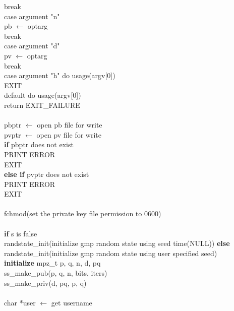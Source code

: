 \documentclass[12pt]{article}
\begin{document}
\indent \indent \indent \indent break \\
\indent \indent \indent case argument "n" \\
\indent \indent \indent \indent pb $\leftarrow$ optarg \\
\indent \indent \indent \indent break \\
\indent \indent \indent case argument "d" \\
\indent \indent \indent \indent pv $\leftarrow$ optarg \\
\indent \indent \indent \indent break \\
\indent \indent \indent case argument "h" do usage(argv[0]) \\
\indent \indent \indent \indent EXIT \\
\indent \indent \indent default do usage(argv[0]) \\
\indent \indent \indent \indent return EXIT\_FAILURE \\
\\
\indent pbptr $\leftarrow$ open pb file for write \\
\indent pvptr $\leftarrow$ open pv file for write \\
\indent \indent \textbf{if} pbptr does not exist \\
\indent \indent \indent PRINT ERROR \\
\indent \indent \indent EXIT \\
\indent \indent \textbf{else if} pvptr does not exist \\
\indent \indent \indent PRINT ERROR \\
\indent \indent \indent EXIT \\
\\
\indent fchmod(set the private key file permission to 0600) \\
\\
\indent \textbf{if} s is false \\
\indent \indent randstate\_init(initialize gmp random state using seed time(NULL))
\indent \textbf{else} \\
\indent \indent randstate\_init(initialize gmp random state using user specified seed)
\\
\indent \textbf{initialize} mpz\_t p, q, n, d, pq \\
\indent ss\_make\_pub(p, q, n, bits, iters) \\
\indent ss\_make\_priv(d, pq, p, q) \\
\\
\indent char *user $\leftarrow$ get username \\
\end{document}
